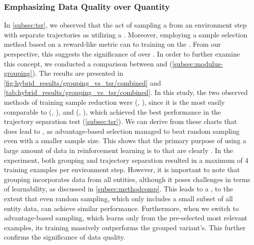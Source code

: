 \subsubsection{Emphasizing Data Quality over Quantity}
\noindent In \autoref{subsec:tsr}, we observed that the act of sampling a  from an environment step with separate trajectories  as utilizing a . Moreover, employing a sample selection method based on a reward-like metric can  to training on the . From our perspective, this suggests the significance of  over . In order to further examine this concept, we conducted a comparison between  and  (\autoref{subsec:modulus-grouping}). The results are presented in \autoref{fig:hybrid_results/grouping_vs_tsr/combined} and \autoref{tab:hybrid_results/grouping_vs_tsr/combined}. In this study, the two observed methods of training sample reduction were  (, ), since it is the most easily comparable to  (, ), and  (, ), which achieved the best performance in the trajectory separation test (\autoref{subsec:tsr}). We can derive from these charts that  does  lead to , as advantage-based selection managed to beat random sampling even with a smaller sample size. This shows that the primary purpose of using a large amount of data in reinforcement learning is to  that are clearly . In the experiment, both grouping and trajectory separation resulted in a maximum of 4 training examples per environment step. However, it is important to note that grouping incorporates data from all entities, although it poses challenges in terms of learnability, as discussed in \autoref{subsec:methodcomp}. This  leads to a , to the extent that even random sampling, which only includes a small subset of all entity data, can achieve similar performance. Furthermore, when we switch to advantage-based sampling, which learns only from the pre-selected most relevant examples, its training massively outperforms the grouped variant's. This further confirms the significance of data quality.

